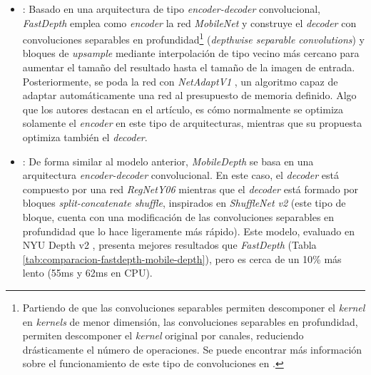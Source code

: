 \begin{itemize}
    \item {} \cite{icra_2019_fastdepth}: Basado en una arquitectura de tipo \textit{encoder-decoder} convolucional, \textit{FastDepth} emplea como \textit{encoder} la red \textit{MobileNet} \cite{mobilenets} y construye el \textit{decoder} con convoluciones separables en profundidad\footnote{Partiendo de que las convoluciones separables permiten descomponer el \textit{kernel} en \textit{kernels}  de menor dimensión, las convoluciones separables en profundidad, permiten descomponer el \textit{kernel} original por canales, reduciendo drásticamente el número de operaciones. Se puede encontrar más información sobre el funcionamiento de este tipo de convoluciones en \cite{mobilenets}.} (\textit{depthwise separable convolutions}) y bloques de \textit{upsample} mediante interpolación de tipo vecino más cercano para aumentar el tamaño del resultado hasta el tamaño de la imagen de entrada. Posteriormente, se poda la red con \textit{NetAdaptV1} \cite{eccv_2018_yang_netadapt}, un algoritmo capaz de adaptar automáticamente una red al presupuesto de memoria definido. Algo que los autores destacan en el artículo, es cómo normalmente se optimiza solamente el \textit{encoder} en este tipo de arquitecturas, mientras que su propuesta optimiza también el \textit{decoder}.
    
    \item {} \cite{wang2020mobiledepth}: De forma similar al modelo anterior, \textit{MobileDepth} se basa en una arquitectura \textit{encoder-decoder} convolucional. En este caso, el \textit{decoder} está compuesto por una red \textit{RegNetY06} \cite{regnety} mientras que el \textit{decoder} está formado por bloques \textit{split-concatenate shuffle}, inspirados en \textit{ShuffleNet v2} (este tipo de bloque, cuenta con una modificación de las convoluciones separables en profundidad que lo hace ligeramente más rápido). Este modelo, evaluado en NYU Depth v2 \cite{nyudepthv2}, presenta mejores resultados que \textit{FastDepth} (Tabla \ref{tab:comparacion-fastdepth-mobile-depth}), pero es cerca de un 10\% más lento (55ms y 62ms en CPU).
    

\end{itemize}
